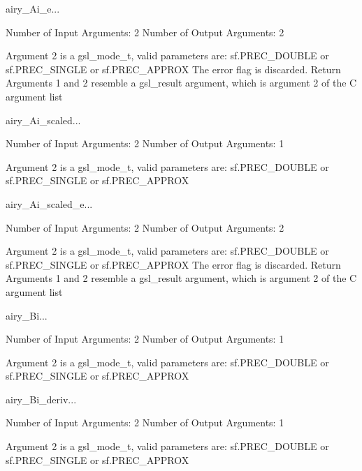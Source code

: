 \begin{funcdesc}{airy_Ai_e}{...}

    Number of Input  Arguments:  2
    Number of Output Arguments:  2

 Argument 2 is a gsl_mode_t, valid parameters are:
	sf.PREC_DOUBLE or sf.PREC_SINGLE or sf.PREC_APPROX
The error flag is discarded.
Return Arguments 1 and 2 resemble a gsl_result argument,
	which is  argument 2 of the C argument list

\end{funcdesc}

\begin{funcdesc}{airy_Ai_scaled}{...}

    Number of Input  Arguments:  2
    Number of Output Arguments:  1

 Argument 2 is a gsl_mode_t, valid parameters are:
	sf.PREC_DOUBLE or sf.PREC_SINGLE or sf.PREC_APPROX

\end{funcdesc}

\begin{funcdesc}{airy_Ai_scaled_e}{...}

    Number of Input  Arguments:  2
    Number of Output Arguments:  2

 Argument 2 is a gsl_mode_t, valid parameters are:
	sf.PREC_DOUBLE or sf.PREC_SINGLE or sf.PREC_APPROX
The error flag is discarded.
Return Arguments 1 and 2 resemble a gsl_result argument,
	which is  argument 2 of the C argument list

\end{funcdesc}

\begin{funcdesc}{airy_Bi}{...}

    Number of Input  Arguments:  2
    Number of Output Arguments:  1

 Argument 2 is a gsl_mode_t, valid parameters are:
	sf.PREC_DOUBLE or sf.PREC_SINGLE or sf.PREC_APPROX

\end{funcdesc}

\begin{funcdesc}{airy_Bi_deriv}{...}

    Number of Input  Arguments:  2
    Number of Output Arguments:  1

 Argument 2 is a gsl_mode_t, valid parameters are:
	sf.PREC_DOUBLE or sf.PREC_SINGLE or sf.PREC_APPROX

\end{funcdesc}

